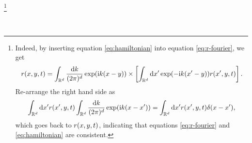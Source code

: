 \documentclass{book}
\newcommand{\mathd}{\mathrm{d}}
\newcommand{\mathi}{\mathrm{i}}
\newcommand{\mathpi}{\pi}
\newcommand{\tmcolor}[2]{{\color{#1}{#2}}}
\begin{document}
\footnote{Indeed, by inserting equation \ref{eq:hamiltonian} into equation
\ref{eq:r-fourier}, we get
\[ {\color[HTML]{000000}r (x, y, t)} = \int_{\mathbb{R}^d} \frac{\mathd k}{(2
   \mathpi)^d} \exp (\mathi k (x - y)) \times \left[ \int_{\mathbb{R}^d}
   \mathd x' \exp (- \mathi k (x' - y)) {\color[HTML]{000000}r (x', y, t)}
   \right] . \]
Re-arrange the right hand side as
\[ \int_{\mathbb{R}^d} \mathd x' {\color[HTML]{000000}r (x', y, t)}
   \int_{\mathbb{R}^d} \frac{\mathd k}{(2 \mathpi)^d} \exp (\mathi k (x - x'))
   = \int_{\mathbb{R}^d} \mathd x' {\color[HTML]{000000}r (x', y, t)} \delta
   (x - x'), \]
which goes back to ${\color[HTML]{000000}r (x, y, t)}$, indicating that
equations \ref{eq:r-fourier} and \ref{eq:hamiltonian} are consistent.
\tmcolor{red}{But, before Fourier transform, we have to prove that $r$ can be
approximated by rapidly decreasing functions.}}

\
\end{document}
